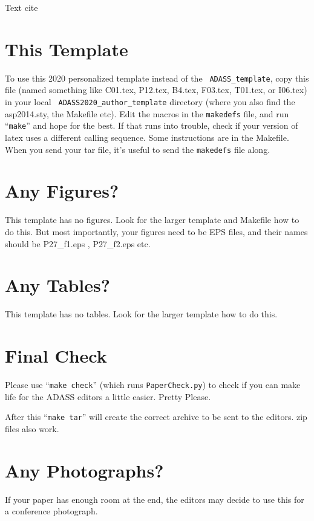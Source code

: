 \documentclass[11pt,twoside]{article}
\begin{document}
Text cite \citep{2019ascl.soft02012A}


\section{This Template}

To use this 2020 personalized template instead of the {\tt
  ADASS\_template}, copy this file (named something like C01.tex,
P12.tex, B4.tex, F03.tex, T01.tex, or I06.tex) in your local {\tt
  ADASS2020\_author\_template} directory (where you also find the
asp2014.sty, the Makefile etc).  Edit the macros in the {\tt makedefs}
file, and run ``{\tt make}'' and hope for the best.  If that runs into
trouble, check if your version of latex uses a different calling
sequence.  Some instructions are in the Makefile. When you send your
tar file, it's useful to send the {\tt makedefs} file along.

\section{Any Figures?}

This template has no figures. Look for the larger template and
Makefile how to do this. But most importantly, your figures need to
be EPS files, and their names should be P27\_f1.eps ,
P27\_f2.eps  etc.

\section{Any Tables?}

This template has no tables. Look for the larger template
how to do this. 

\section{Final Check}

Please use ``{\tt make check}'' (which runs {\tt PaperCheck.py}) to
check if you can make life for the ADASS editors a little
easier. Pretty Please.

After this ``{\tt make tar}'' will create the correct archive to be sent to
the editors. zip files also work.

\section{Any Photographs?}

If your paper has enough room at the end, the editors may decide to use this
for a conference photograph.
\end{document}
